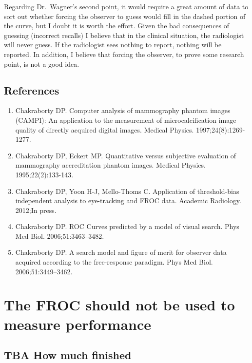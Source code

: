 \documentclass[
]{book}
\providecommand{\tightlist}{%
  \setlength{\itemsep}{0pt}\setlength{\parskip}{0pt}}
\begin{document}
Regarding Dr.~Wagner's second point, it would require a great amount of data to sort out whether forcing the observer to guess would fill in the dashed portion of the curve, but I doubt it is worth the effort. Given the bad consequences of guessing (incorrect recalls) I believe that in the clinical situation, the radiologist will never guess. If the radiologist sees nothing to report, nothing will be reported. In addition, I believe that forcing the observer, to prove some research point, is not a good idea.

\hypertarget{rsm-sc-references}{%
\section{References}\label{rsm-sc-references}}

\begin{enumerate}
\def\labelenumi{\arabic{enumi}.}
\tightlist
\item
  Chakraborty DP. Computer analysis of mammography phantom images (CAMPI): An application to the measurement of microcalcification image quality of directly acquired digital images. Medical Physics. 1997;24(8):1269-1277.
\item
  Chakraborty DP, Eckert MP. Quantitative versus subjective evaluation of mammography accreditation phantom images. Medical Physics. 1995;22(2):133-143.
\item
  Chakraborty DP, Yoon H-J, Mello-Thoms C. Application of threshold-bias independent analysis to eye-tracking and FROC data. Academic Radiology. 2012;In press.
\item
  Chakraborty DP. ROC Curves predicted by a model of visual search. Phys Med Biol. 2006;51:3463--3482.
\item
  Chakraborty DP. A search model and figure of merit for observer data acquired according to the free-response paradigm. Phys Med Biol. 2006;51:3449--3462.
\end{enumerate}

\hypertarget{rsm-goodbye-froc}{%
\chapter{The FROC should not be used to measure performance}\label{rsm-goodbye-froc}}

\hypertarget{rsm-goodbye-how-much-finished}{%
\section{TBA How much finished}\label{rsm-goodbye-how-much-finished}}
\end{document}
